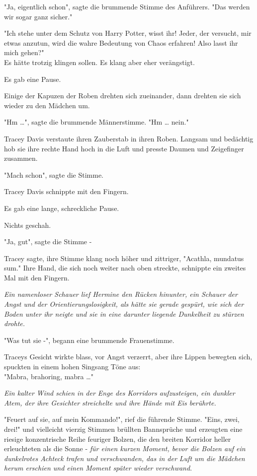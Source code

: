 {"Ja, eigentlich schon", sagte die brummende Stimme des Anführers. "Das werden wir sogar ganz sicher."

"Ich stehe unter dem Schutz von Harry Potter, wisst ihr! Jeder, der versucht, mir etwas anzutun, wird die wahre Bedeutung von Chaos erfahren! Also lasst ihr mich gehen?"\\ Es hätte trotzig klingen sollen. Es klang aber eher verängstigt.

Es gab eine Pause.

Einige der Kapuzen der Roben drehten sich zueinander, dann drehten sie sich wieder zu den Mädchen um.

"Hm …", sagte die brummende Männerstimme. "Hm … nein."

Tracey Davis verstaute ihren Zauberstab in ihren Roben. Langsam und bedächtig hob sie ihre rechte Hand hoch in die Luft und presste Daumen und Zeigefinger zusammen.

"Mach schon", sagte die Stimme.

Tracey Davis schnippte mit den Fingern.

Es gab eine lange, schreckliche Pause.

Nichts geschah.

"Ja, gut", sagte die Stimme -

Tracey sagte, ihre Stimme klang noch höher und zittriger, "Acathla, mundatus sum." Ihre Hand, die sich noch weiter nach oben streckte, schnippte ein zweites Mal mit den Fingern.

\emph{Ein namenloser Schauer lief Hermine den Rücken hinunter, ein Schauer der Angst und der Orientierungslosigkeit, als hätte sie gerade gespürt, wie sich der Boden unter ihr neigte und sie in eine darunter liegende Dunkelheit zu stürzen drohte.}

"Was tut sie -", begann eine brummende Frauenstimme.

Traceys Gesicht wirkte blass, vor Angst verzerrt, aber ihre Lippen bewegten sich, spuckten in einem hohen Singsang Töne aus:\\ "Mabra, brahoring, mabra …"

\emph{Ein kalter Wind schien in der Enge des Korridors aufzusteigen, ein dunkler Atem, der ihre Gesichter streichelte und ihre Hände mit Eis berührte.}

"Feuert auf sie, auf mein Kommando!", rief die führende Stimme. "Eins, zwei, drei!" und vielleicht vierzig Stimmen brüllten Bannsprüche und erzeugten eine riesige konzentrische Reihe feuriger Bolzen, die den breiten Korridor heller erleuchteten als die Sonne - \emph{für einen kurzen Moment, bevor die Bolzen auf ein dunkelrotes Achteck trafen und verschwanden, das in der Luft um die Mädchen herum erschien und einen Moment später wieder verschwand}.

}
